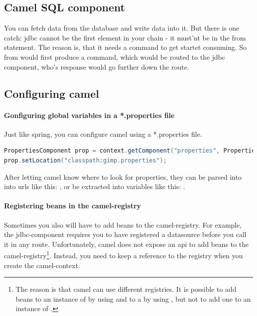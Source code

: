 \subsection{Camel SQL component}

You can fetch data from the database and write data into it. 
But there is one catch: jdbc cannot be the first element in your chain - it must'nt be in the from statement. 
The reason is, that it needs a command to get startet consuming. So from would first produce a command, which would be routed to the jdbc component, who's response would go further down the route. 

\subsection{Configuring camel}

\paragraph{Gonfiguring global variables in a *.properties file} Just like spring, you can configure camel using a *.properties file. 

\begin{lstlisting}[language=java]
PropertiesComponent prop = context.getComponent("properties", PropertiesComponent.class);
prop.setLocation("classpath:gimp.properties");
\end{lstlisting}

After letting camel know where to look for properties, they can be parsed into into urls like this: , or be extracted into variables like this: .


\paragraph{Registering beans in the camel-registry} Sometimes you also will have to add beans to the camel-registry. For example, the jdbc-component requires you to have registered a datasource before you call it in any route. Unfortunately, camel does not expose an api to add beans to the camel-registry\footnote{The reason is that camel can use different registries. It is possible to add beans to an instance of  by using  and to a  by using , but not to add one to an instance of .}. Instead, you need to keep a reference to the registry when you create the camel-context.

